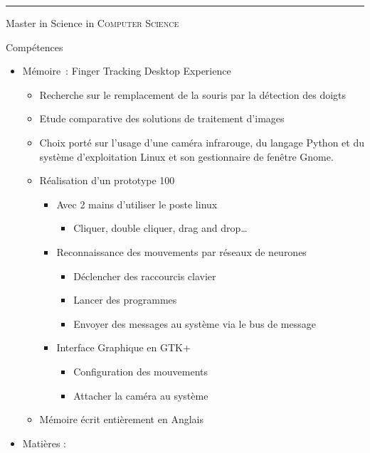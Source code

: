 \documentclass[a4paper,10pt]{article}
\begin{document}
\bigskip
\hrule
\bigskip
\newpage

\par{\centering\Large \hypertarget{oxford}{Master in Science in \textsc{Computer Science}}\par}\large{\centering Compétences\par}\normalsize

\begin{itemize}
	\item Mémoire : Finger Tracking Desktop Experience
		\begin{itemize}
			\item Recherche sur le remplacement de la souris par la détection des doigts
			\item Etude comparative des solutions de traitement d’images
			\item Choix porté sur l’usage d’une caméra infrarouge, du langage Python et du système d’exploitation Linux et son gestionnaire de fenêtre Gnome.
			\item Réalisation d’un prototype 100%
			\begin{itemize}
				\item Avec 2 mains d’utiliser le poste linux
					\begin{itemize}
						\item Cliquer, double cliquer, drag and drop…
					\end{itemize}
				\item Reconnaissance des mouvements par réseaux de neurones
					\begin{itemize}
						\item Déclencher des raccourcis clavier
						\item Lancer des programmes
						\item Envoyer des messages au système via le bus de message
					\end{itemize}
				\item Interface Graphique en GTK+
					\begin{itemize}
						\item Configuration des mouvements
						\item Attacher la caméra au système
					\end{itemize}
			\end{itemize}
			\item Mémoire écrit entièrement en Anglais
		\end{itemize}
 	\item Matières :
		\begin{itemize}

\end{itemize}
\end{itemize}
\end{document}
